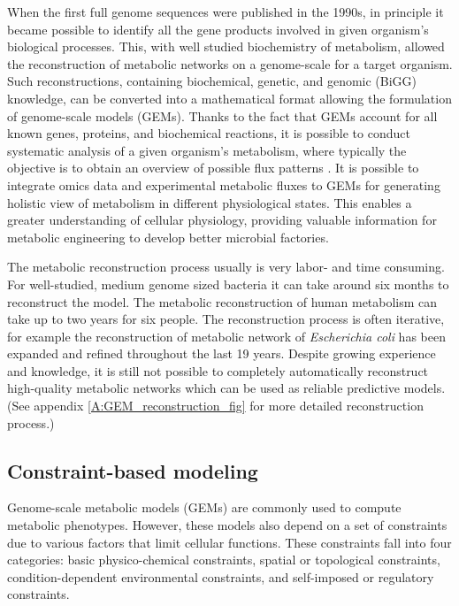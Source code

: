 When the first full genome sequences were published in the 1990s, in principle it became possible to identify all the gene products involved in 
given organism's biological processes. This, with well studied biochemistry of metabolism, allowed the reconstruction of metabolic networks on a genome-scale
for a target organism. Such reconstructions, containing biochemical, genetic, and genomic (BiGG) knowledge, can be converted into a mathematical format 
allowing the formulation of genome-scale models (GEMs). \cite{Palsson2009}
Thanks to the fact that GEMs account for all known genes, proteins, and biochemical reactions, it is possible to  
conduct systematic analysis of a given organism's metabolism, where typically the objective is to obtain an overview of possible flux
patterns \cite{Kerkhoven2014, Chen2023}. %
It is possible to integrate omics data and experimental metabolic fluxes to GEMs for generating holistic 
view of metabolism in different physiological states. This enables a greater understanding of cellular physiology, providing valuable information 
for metabolic engineering to develop better microbial factories.

The metabolic reconstruction process usually is very labor- and time consuming. For well-studied, medium genome sized bacteria it can take around six months to reconstruct the model. 
The metabolic reconstruction of human metabolism can take up to two years for six people. The reconstruction process is often iterative, for example the reconstruction of metabolic 
network of \textit{Escherichia coli} has been expanded and refined throughout the last 19 years. Despite growing experience and 
knowledge, it is still not possible to completely automatically reconstruct high-quality metabolic networks which can be used as reliable predictive models. \cite{Thiele2010} 
(See appendix \ref{A:GEM_reconstruction_fig} for more detailed reconstruction process.) 

\subsection{Constraint-based modeling}

Genome-scale metabolic models (GEMs) are commonly used to compute metabolic phenotypes. However, these models also depend on a set of constraints due to various factors that limit cellular functions. These constraints fall into four categories: basic physico-chemical constraints, spatial or topological constraints, condition-dependent environmental constraints, and self-imposed or regulatory constraints. \cite{Price2004}

